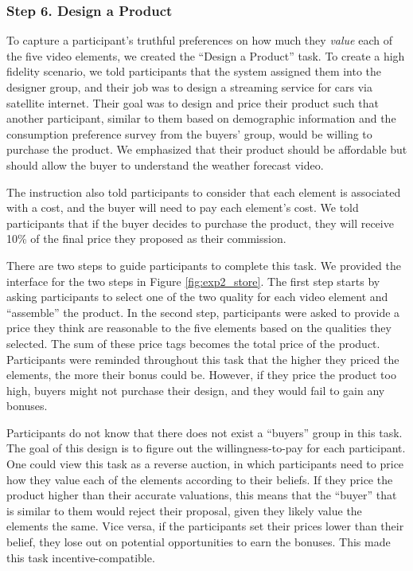 \subsubsection{Step 6. Design a Product}
To capture a participant's truthful preferences on how much they \textit{value} each of the five video elements, we created the ``Design a Product'' task. To create a high fidelity scenario, we told participants that the system assigned them into the designer group, and their job was to design a streaming service for cars via satellite internet. Their goal was to design and price their product such that another participant, similar to them based on demographic information and the consumption preference survey from the buyers' group, would be willing to purchase the product. We emphasized that their product should be affordable but should allow the buyer to understand the weather forecast video.

The instruction also told participants to consider that each element is associated with a cost, and the buyer will need to pay each element's cost. We told participants that if the buyer decides to purchase the product, they will receive 10\% of the final price they proposed as their commission. 

There are two steps to guide participants to complete this task. We provided the interface for the two steps in Figure \ref{fig:exp2_store}. The first step starts by asking participants to select one of the two quality for each video element and ``assemble'' the product. In the second step, participants were asked to provide a price they think are reasonable to the five elements based on the qualities they selected. The sum of these price tags becomes the total price of the product. Participants were reminded throughout this task that the higher they priced the elements, the more their bonus could be. However, if they price the product too high, buyers might not purchase their design, and they would fail to gain any bonuses. 

Participants do not know that there does not exist a ``buyers'' group in this task. The goal of this design is to figure out the willingness-to-pay for each participant. One could view this task as a reverse auction, in which participants need to price how they value each of the elements according to their beliefs. If they price the product higher than their accurate valuations, this means that the ``buyer'' that is similar to them would reject their proposal, given they likely value the elements the same. Vice versa, if the participants set their prices lower than their belief, they lose out on potential opportunities to earn the bonuses. This made this task incentive-compatible. 

